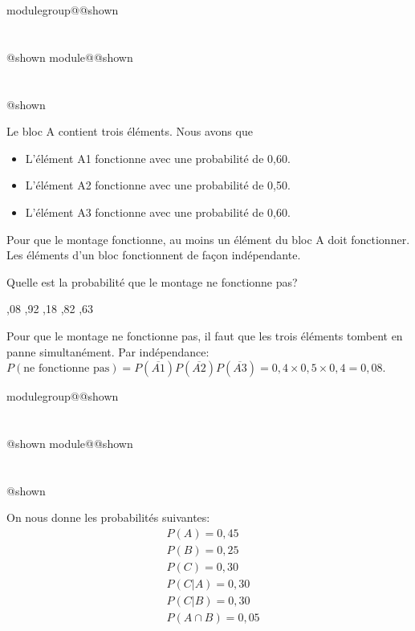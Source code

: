 \documentclass{Evaluation}
\makeatletter
\newcommand{\currentmodulekey}{}
\newcommand{\currentmoduletitle}{}
\newcommand{\currentgroupkey}{}
\newcommand{\currentgrouptitle}{}
\newcommand{\showmoduleifneeded}{%
  \ifx\currentgroupkey\empty\else
    \expandafter\ifx\csname modulegroup@\currentgroupkey @shown\endcsname\relax
      \section*{\currentgrouptitle}%
      \expandafter\gdef\csname modulegroup@\currentgroupkey @shown\endcsname{1}%
    \fi
  \fi
  \expandafter\ifx\csname module@\currentmodulekey @shown\endcsname\relax
    \section*{\currentmoduletitle}%
    \expandafter\gdef\csname module@\currentmodulekey @shown\endcsname{1}%
  \fi
}
\newenvironment{A23}{\showmoduleifneeded}{}
\newenvironment{A25}{\showmoduleifneeded}{}
\makeatother
\begin{document}
\begin{questions}
\begin{A23}
\begin{figure}[h!]
\begin{center}
 \end{center}
\end{figure}

 Le bloc A contient trois éléments. Nous avons que
\begin{itemize}
    \item L'élément A1 fonctionne avec une probabilité de 0,60.
    \item L'élément A2 fonctionne avec une probabilité de 0,50.
    \item L'élément A3 fonctionne avec une probabilité de 0,60.
\end{itemize}
Pour que le montage fonctionne, au moins un élément du bloc A doit fonctionner. Les éléments d'un bloc fonctionnent de façon indépendante.


 Quelle est la probabilité que le montage ne fonctionne pas?

 \begin{oneparcheckboxes}
		,08
		,92
		,18
		,82
		,63
\end{oneparcheckboxes}

\begin{solution}
    Pour que le montage ne fonctionne pas, il faut que les trois éléments tombent en panne simultanément. Par indépendance: $P(\text{ne fonctionne pas})=P(\overline{A1})P(\overline{A2})P(\overline{A3})=0,4\times 0,5\times 0,4=0,08$.
\end{solution}
\end{A23}

\begin{A25}
\question {} %
On nous donne les probabilités suivantes:
\[
\begin{aligned}
    & P(A) = 0,45 \\
    & P(B) = 0,25 \\
    & P(C) = 0,30 \\
    & P(C|A) = 0,30 \\
    & P(C|B) = 0,30 \\
    & P(A \cap B) = 0,05 \\
\end{aligned}
\]


\end{A25}
\end{questions}
\end{document}
